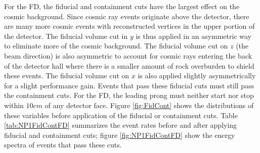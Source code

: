For the FD, the fiducial and containment cuts have the largest effect on the cosmic background. Since cosmic ray events originate above the detector, there are many more cosmic events with reconstructed vertices in the upper portion of the detector. The fiducial volume cut in $y$ is thus applied in an asymmetric way to eliminate more of the cosmic background. The fiducial volume cut on $z$ (the beam direction) is also asymmetric to account for cosmic rays entering the back of the detector hall where there is a smaller amount of rock overburden to shield these events. The fiducial volume cut on $x$ is also applied slightly asymmetrically for a slight performance gain. Events that pass these fiducial cuts must still pass the containment cuts. For the FD, the leading prong must neither start nor stop within $10\unit{cm}$ of any detector face. Figure \ref{fig:FidCont} shows the distributions of these variables before application of the fiducial or containment cuts. Table \ref{tab:NP1FidContFD} summarizes the event rates before and after applying fiducial and containment cuts; figure \ref{fig:NP1FidContFD} show the energy spectra of events that pass these cuts.
